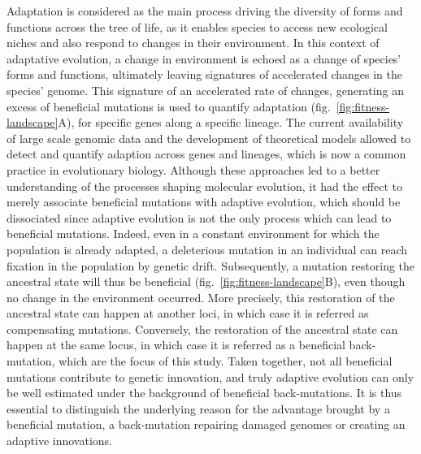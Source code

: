 \documentclass{article}
\begin{document}
    Adaptation is considered as the main process driving the diversity of forms and functions across the tree of life, as it enables species to access new ecological niches and also respond to changes in their environment\cite{darwin_origin_1859}.
    In this context of adaptative evolution, a change in environment is echoed as a change of species' forms and functions, ultimately leaving signatures of accelerated changes in the species' genome\cite{merrell_adaptive_1994}.
    This signature of an accelerated rate of changes, generating an excess of beneficial mutations is used to quantify adaptation (fig.~\ref{fig:fitness-landscape}A), for specific genes along a specific lineage\cite{mcdonald_adaptative_1991, smith_adaptive_2002a, welch_estimating_2006}.
    The current availability of large scale genomic data and the development of theoretical models allowed to detect and quantify adaption across genes and lineages, which is now a common practice in evolutionary biology\cite{yang_statistical_2000, eyre-walker_genomic_2006, moutinho_variation_2019}.
    Although these approaches led to a better understanding of the processes shaping molecular evolution, it had the effect to merely associate beneficial mutations with adaptive evolution, which should be dissociated since adaptive evolution is not the only process which can lead to beneficial mutations\cite{charlesworth_other_2007, mustonen_fitness_2009}.
    Indeed, even in a constant environment for which the population is already adapted, a deleterious mutation in an individual can reach fixation in the population by genetic drift\cite{Ohta1992}.
    Subsequently, a mutation restoring the ancestral state will thus be beneficial (fig.~\ref{fig:fitness-landscape}B), even though no change in the environment occurred\cite{hartl_compensatory_1996, sella_application_2005, mustonen_fitness_2009, cvijovic_fate_2015}.
    More precisely, this restoration of the ancestral state can happen at another loci, in which case it is referred as compensating mutations\cite{hartl_compensatory_1996, mustonen_fitness_2009}.
    Conversely, the restoration of the ancestral state can happen at the same locus, in which case it is referred as a beneficial back-mutation\cite{piganeau_estimating_2003, charlesworth_other_2007}, which are the focus of this study.
    Taken together, not all beneficial mutations contribute to genetic innovation, and truly adaptive evolution can only be well estimated under the background of beneficial back-mutations\cite{keightley_what_2010, rice_evolutionarily_2015}.
    It is thus essential to distinguish the underlying reason for the advantage brought by a beneficial mutation, a back-mutation repairing damaged genomes or creating an adaptive innovations.
\end{document}
